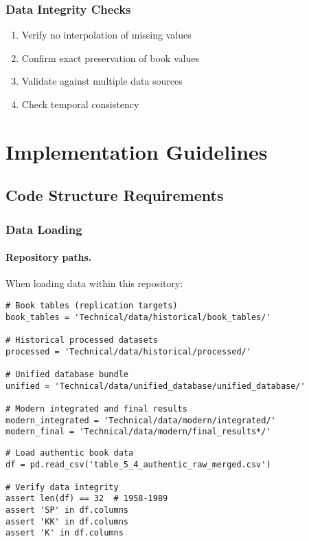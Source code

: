 \documentclass[12pt,a4paper]{article}
\begin{document}
\subsubsection{Data Integrity Checks}
\begin{enumerate}
    \item Verify no interpolation of missing values
    \item Confirm exact preservation of book values
    \item Validate against multiple data sources
    \item Check temporal consistency
\end{enumerate}

\section{Implementation Guidelines}

\subsection{Code Structure Requirements}

\subsubsection{Data Loading}
\paragraph{Repository paths.} When loading data within this repository:
\begin{verbatim}
# Book tables (replication targets)
book_tables = 'Technical/data/historical/book_tables/'

# Historical processed datasets
processed = 'Technical/data/historical/processed/'

# Unified database bundle
unified = 'Technical/data/unified_database/unified_database/'

# Modern integrated and final results
modern_integrated = 'Technical/data/modern/integrated/'
modern_final = 'Technical/data/modern/final_results*/'
\end{verbatim}
\begin{verbatim}
# Load authentic book data
df = pd.read_csv('table_5_4_authentic_raw_merged.csv')

# Verify data integrity
assert len(df) == 32  # 1958-1989
assert 'SP' in df.columns
assert 'KK' in df.columns
assert 'K' in df.columns
\end{verbatim}
\end{document}
